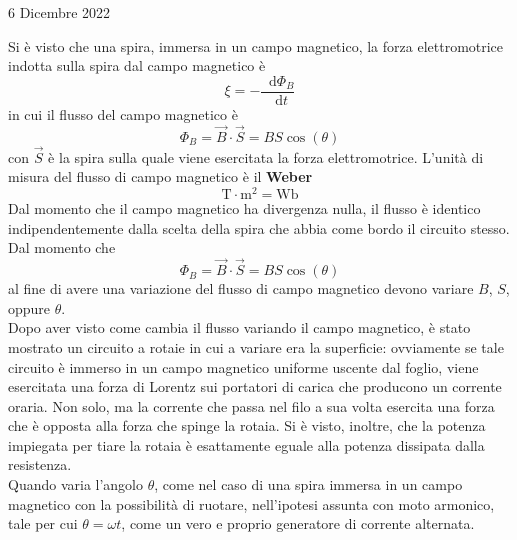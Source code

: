 \documentclass[a4paper]{extarticle}
\newcommand\dif{\mathop{}\!\mathrm{d}}
\begin{document}
\newpage
\noindent
\begin{center}
  6 Dicembre 2022
\end{center}
Si è visto che una spira, immersa in un campo magnetico, la forza elettromotrice indotta sulla spira dal campo magnetico è
\[\xi = -\dfrac{\dif \Phi_B}{\dif t}\]
in cui il flusso del campo magnetico è
\[\Phi_B = \vec B \cdot \vec S = B S \cos(\theta)\]
con $\vec S$ è la spira sulla quale viene esercitata la forza elettromotrice. L'unità di misura del flusso di campo magnetico è il \textbf{Weber}
\[\text{T} \cdot \text{m}^2 = \text{Wb}\]
Dal momento che il campo magnetico ha divergenza nulla, il flusso è identico indipendentemente dalla scelta della spira che abbia come bordo il circuito stesso.\\
Dal momento che
\[\Phi_B = \vec B \cdot \vec S = B S \cos(\theta)\]
al fine di avere una variazione del flusso di campo magnetico devono variare $B$, $S$, oppure $\theta$.\\
Dopo aver visto come cambia il flusso variando il campo magnetico, è stato mostrato un circuito a rotaie in cui a variare era la superficie: ovviamente se tale circuito è immerso in un campo magnetico uniforme uscente dal foglio, viene esercitata una forza di Lorentz sui portatori di carica che producono un corrente oraria. Non solo, ma la corrente che passa nel filo a sua volta esercita una forza che è opposta alla forza che spinge la rotaia. Si è visto, inoltre, che la potenza impiegata per tiare la rotaia è esattamente eguale alla potenza dissipata dalla resistenza.\\
Quando varia l'angolo $\theta$, come nel caso di una spira immersa in un campo magnetico con la possibilità di ruotare, nell'ipotesi assunta con moto armonico, tale per cui $\theta=\omega t$, come un vero e proprio generatore di corrente alternata.
\end{document}

